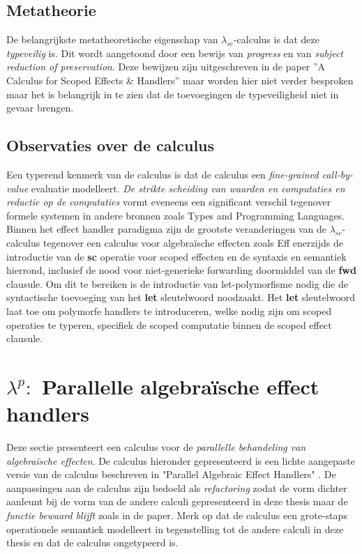 \subsection{Metatheorie}
De belangrijkste metatheoretische eigenschap van $\lambda_{sc}$-calculus is dat deze \emph{typeveilig} is. Dit wordt aangetoond door een bewijs van \emph{progress} en van \emph{subject reduction of preservation}. Deze bewijzen zijn uitgeschreven in de paper ''A Calculus for Scoped Effects \& Handlers'' \cite{Bosman2022} maar worden hier niet verder besproken maar het is belangrijk in te zien dat de toevoegingen de typeveiligheid niet in gevaar brengen.

\subsection{Observaties over de calculus}
Een typerend kenmerk van de calculus is dat de calculus een \emph{fine-grained call-by-value} evaluatie modelleert. \emph{De strikte scheiding van waarden en computaties en reductie op de computaties} vormt eveneens een significant verschil tegenover formele systemen in andere bronnen zoals Types and Programming Languages\cite{Pierce2002}. \newline
Binnen het effect handler paradigma zijn de grootste veranderingen van de $\lambda_{sc}$-calculus tegenover een calculus voor algebraïsche effecten zoals Eff \cite{Bauer2015} enerzijds de introductie van de \textbf{sc} operatie voor scoped effecten en de syntaxis en semantiek hierrond, inclusief de nood voor niet-generieke forwarding doormiddel van de \textbf{fwd} clausule. Om dit te bereiken is de introductie van let-polymorfisme nodig die de syntactische toevoeging van het \textbf{let} sleutelwoord noodzaakt. Het \textbf{let} sleutelwoord laat toe om polymorfe handlers te introduceren, welke nodig zijn om scoped operaties te typeren, specifiek de scoped computatie binnen de scoped effect clausule.

\section{\texorpdfstring{$\lambda^{p}:$}{} Parallelle algebraïsche effect handlers} \label{hoofdstuk:startpuntParallel}
Deze sectie presenteert een calculus voor de \emph{parallelle behandeling van algebraïsche effecten}. De calculus hieronder gepresenteerd is een lichte aangepaste versie van de calculus beschreven in "Parallel Algebraic Effect Handlers" \cite{Xie2021}. De aanpassingen aan de calculus zijn bedoeld als \emph{refactoring} zodat de vorm dichter aanleunt bij de vorm van de andere calculi gepresenteerd in deze thesis maar de \emph{functie bewaard blijft} zoals in de paper. Merk op dat de calculus een grote-staps operationele semantiek modelleert in tegenstelling tot de andere calculi in deze thesis en dat de calculus ongetypeerd is.


